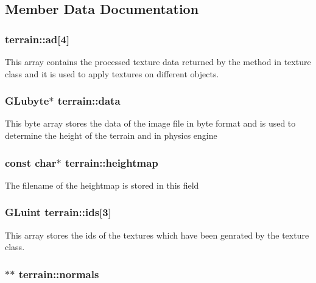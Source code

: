 \subsection{\-Member \-Data \-Documentation}
\hypertarget{classterrain_a71030654906d773de10eedbf121093b0}{
\subsubsection[{ad}]{ {\bf terrain\-::ad}\mbox{[}4\mbox{]}}}\label{classterrain_a71030654906d773de10eedbf121093b0}
\-This array contains the processed texture data returned by the method in texture class and it is used to apply textures on different objects. \hypertarget{classterrain_ad07206f55359d1f2084ece2b06675425}{
\subsubsection[{data}]{\setlength{\rightskip}{0pt plus 5cm}\-G\-Lubyte$\ast$ {\bf terrain\-::data}}}\label{classterrain_ad07206f55359d1f2084ece2b06675425}
\-This byte array stores the data of the image file in byte format and is used to determine the height of the terrain and in physics engine \hypertarget{classterrain_abcf95fb0b8f7ef597a708e22ff10f42f}{
\subsubsection[{heightmap}]{\setlength{\rightskip}{0pt plus 5cm}const char$\ast$ {\bf terrain\-::heightmap}}}\label{classterrain_abcf95fb0b8f7ef597a708e22ff10f42f}
\-The filename of the heightmap is stored in this field \hypertarget{classterrain_abab37c6ed21ad3de44b7b11f31b702e6}{
\subsubsection[{ids}]{\setlength{\rightskip}{0pt plus 5cm}\-G\-Luint {\bf terrain\-::ids}\mbox{[}3\mbox{]}}}\label{classterrain_abab37c6ed21ad3de44b7b11f31b702e6}
\-This array stores the ids of the textures which have been genrated by the texture class. \hypertarget{classterrain_a117ae013cf3d2da36b6febe47619c69b}{
\subsubsection[{normals}]{$\ast$$\ast$ {\bf terrain\-::normals}}}\label{classterrain_a117ae013cf3d2da36b6febe47619c69b}
